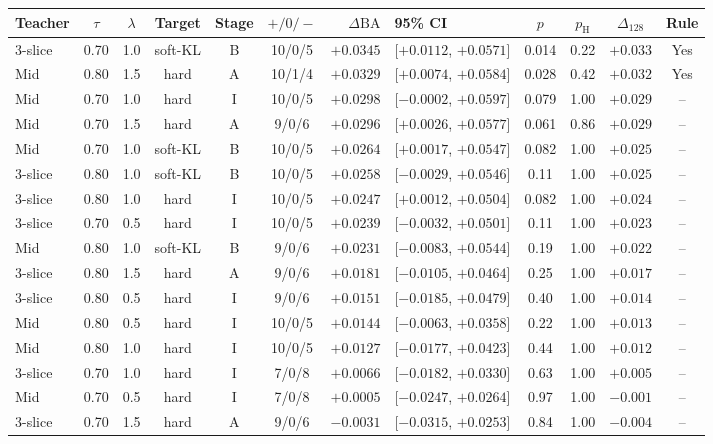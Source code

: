 \documentclass[pdflatex,sn-vancouver,Numbered]{sn-jnl}
\begin{document}
\begin{minipage}{\textwidth}
\centering
\scriptsize
\setlength{\tabcolsep}{1.6pt}
\renewcommand{\arraystretch}{0.9}
\begin{tabular}{@{}lcccccrlcccc@{}}
\toprule
Teacher & $\tau$ & $\lambda$ & Target & Stage & $+/0/-$ & $\Delta\mathrm{BA}$ & 95\% CI & $p$ & $p_{\mathrm{H}}$ & $\Delta_{128}$ & Rule \\
\midrule
3-slice & 0.70 & 1.0 & soft-KL & B & 10/0/5 & $+0.0345$ & [$+0.0112$, $+0.0571$] & 0.014 & 0.22 & $+0.033$ & Yes \\
Mid & 0.80 & 1.5 & hard & A & 10/1/4 & $+0.0329$ & [$+0.0074$, $+0.0584$] & 0.028 & 0.42 & $+0.032$ & Yes \\
Mid & 0.70 & 1.0 & hard & I & 10/0/5 & $+0.0298$ & [$-0.0002$, $+0.0597$] & 0.079 & 1.00 & $+0.029$ & -- \\
Mid & 0.70 & 1.5 & hard & A & 9/0/6 & $+0.0296$ & [$+0.0026$, $+0.0577$] & 0.061 & 0.86 & $+0.029$ & -- \\
Mid & 0.70 & 1.0 & soft-KL & B & 10/0/5 & $+0.0264$ & [$+0.0017$, $+0.0547$] & 0.082 & 1.00 & $+0.025$ & -- \\
3-slice & 0.80 & 1.0 & soft-KL & B & 10/0/5 & $+0.0258$ & [$-0.0029$, $+0.0546$] & 0.11 & 1.00 & $+0.025$ & -- \\
3-slice & 0.80 & 1.0 & hard & I & 10/0/5 & $+0.0247$ & [$+0.0012$, $+0.0504$] & 0.082 & 1.00 & $+0.024$ & -- \\
3-slice & 0.70 & 0.5 & hard & I & 10/0/5 & $+0.0239$ & [$-0.0032$, $+0.0501$] & 0.11 & 1.00 & $+0.023$ & -- \\
Mid & 0.80 & 1.0 & soft-KL & B & 9/0/6 & $+0.0231$ & [$-0.0083$, $+0.0544$] & 0.19 & 1.00 & $+0.022$ & -- \\
3-slice & 0.80 & 1.5 & hard & A & 9/0/6 & $+0.0181$ & [$-0.0105$, $+0.0464$] & 0.25 & 1.00 & $+0.017$ & -- \\
3-slice & 0.80 & 0.5 & hard & I & 9/0/6 & $+0.0151$ & [$-0.0185$, $+0.0479$] & 0.40 & 1.00 & $+0.014$ & -- \\
Mid & 0.80 & 0.5 & hard & I & 10/0/5 & $+0.0144$ & [$-0.0063$, $+0.0358$] & 0.22 & 1.00 & $+0.013$ & -- \\
Mid & 0.80 & 1.0 & hard & I & 10/0/5 & $+0.0127$ & [$-0.0177$, $+0.0423$] & 0.44 & 1.00 & $+0.012$ & -- \\
3-slice & 0.70 & 1.0 & hard & I & 7/0/8 & $+0.0066$ & [$-0.0182$, $+0.0330$] & 0.63 & 1.00 & $+0.005$ & -- \\
Mid & 0.70 & 0.5 & hard & I & 7/0/8 & $+0.0005$ & [$-0.0247$, $+0.0264$] & 0.97 & 1.00 & $-0.001$ & -- \\
3-slice & 0.70 & 1.5 & hard & A & 9/0/6 & $-0.0031$ & [$-0.0315$, $+0.0253$] & 0.84 & 1.00 & $-0.004$ & -- \\
\bottomrule
\end{tabular}
\end{minipage}
\clearpage
\end{document}
